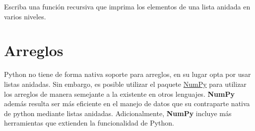 \begin{code} Escriba una función recursiva que imprima los elementos de una lista anidada en varios niveles.

\begin{Shaded}
\begin{Highlighting}[]
\OperatorTok{=}\NormalTok{ [}\NormalTok{, }\NormalTok{, }\NormalTok{, }\NormalTok{, }\NormalTok{, }\NormalTok{, }
            \NormalTok{, }\NormalTok{]}
\OperatorTok{=}\NormalTok{ [}\NormalTok{, }\NormalTok{, }\NormalTok{, }\NormalTok{, }\NormalTok{]}
\OperatorTok{=}\NormalTok{ [}\NormalTok{, }\NormalTok{, }\NormalTok{, }\NormalTok{]}
\OperatorTok{=}\NormalTok{ [}\NormalTok{, }\NormalTok{, }\NormalTok{, }\NormalTok{, }\NormalTok{, }\NormalTok{, }\NormalTok{, }\NormalTok{]}
\OperatorTok{=}\NormalTok{ [lista1 }\OperatorTok{+}\OperatorTok{+}\NormalTok{ lista3] }\OperatorTok{+}\NormalTok{ [[lista4]] }\OperatorTok{+}

         \NormalTok{):}
        \NormalTok{: }

\end{Highlighting}
\end{Shaded}
\end{code}

\section{Arreglos}

Python no tiene de forma nativa soporte para arreglos, en su lugar opta
por usar listas anidadas. Sin embargo, es posible utilizar el paquete
\href{https://numpy.org/}{NumPy} para utilizar los arreglos de manera
semejante a la existente en otros lenguajes. \textbf{NumPy} además
resulta ser más eficiente en el manejo de datos que su contraparte
nativa de python mediante listas anidadas. Adicionalmente,
\textbf{NumPy} incluye más herramientas que extienden la funcionalidad
de Python.

